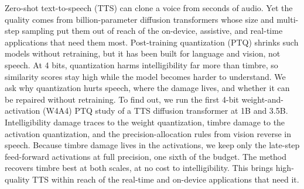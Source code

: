 Zero-shot text-to-speech (TTS) can clone a voice from seconds of audio. 
Yet the quality comes from billion-parameter diffusion transformers whose size and multi-step sampling put them out of reach of the on-device, assistive, and real-time applications that need them most.
Post-training quantization (PTQ) shrinks such models without retraining, but it has been built for language and vision, not speech. 
At 4 bits, quantization harms intelligibility far more than timbre, so similarity scores stay high while the model becomes harder to understand. 
We ask why quantization hurts speech, where the damage lives, and whether it can be repaired without retraining. 
To find out, we run the first 4-bit weight-and-activation (W4A4) PTQ study of a TTS diffusion transformer at 1B and 3.5B. 
Intelligibility damage traces to the weight quantization, timbre damage to the activation quantization, and the precision-allocation rules from vision reverse in speech. 
Because timbre damage lives in the activations, we keep only the late-step feed-forward activations at full precision, one sixth of the budget. 
The method recovers timbre best at both scales, at no cost to intelligibility. 
This brings high-quality TTS within reach of the real-time and on-device applications that need it.
